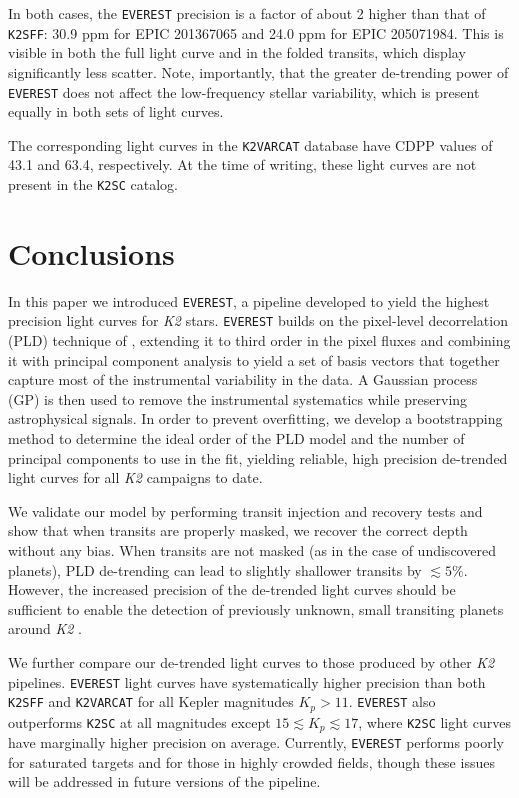 \documentclass[]{emulateapj}
\begin{document}
In both cases, the \texttt{EVEREST} precision is a factor of about 2 higher than that of
\texttt{K2SFF}: 30.9 ppm for EPIC 201367065 and 24.0 ppm for EPIC 205071984. This is visible 
in both the full light curve and in the folded transits,
which display significantly less scatter. Note, importantly, that the greater de-trending
power of \texttt{EVEREST} does not affect the low-frequency stellar variability, which is 
present equally in both sets of light curves.

The corresponding light curves in the \texttt{K2VARCAT} database have CDPP values of 43.1
and 63.4, respectively. At the time of writing, these light curves are not present in the
\texttt{K2SC} catalog.

\section{Conclusions}
\label{sec:conclusions}
In this paper we introduced \texttt{EVEREST}, a pipeline developed to yield the highest
precision light curves for \emph{K2} stars. \texttt{EVEREST} builds on the pixel-level
decorrelation (PLD) technique of \cite{DEM15}, extending it to third order in the pixel
fluxes and combining it with principal component analysis to yield a set of basis
vectors that together capture most of the instrumental variability in the data. A Gaussian
process (GP) is then used to remove the instrumental
systematics while preserving astrophysical signals. In order to prevent overfitting, we
develop a bootstrapping method to determine the ideal order of the PLD
model and the number of principal components to use in the fit, yielding reliable,
high precision de-trended light curves for all \emph{K2} campaigns to date.

We validate our model by performing transit injection and recovery tests and show that
when transits are properly masked, we recover the correct depth without any bias.
When transits are not masked (as in the case of undiscovered planets), PLD de-trending
can lead to slightly shallower transits by $\lesssim 5\%$. However, the increased
precision of the de-trended light curves should be sufficient to enable the
detection of previously unknown, small transiting planets around \emph{K2} \citep{KRU16}.

We further compare our de-trended light curves to those produced by other \emph{K2} pipelines.
\texttt{EVEREST} light curves have systematically higher precision than both \texttt{K2SFF}
and \texttt{K2VARCAT} for all Kepler magnitudes $K_p > 11$. \texttt{EVEREST} also outperforms
\texttt{K2SC} at all magnitudes except $15 \lesssim K_p \lesssim 17$, where \texttt{K2SC}
light curves have marginally higher precision on average. Currently, \texttt{EVEREST}
performs poorly for saturated targets and for those in highly crowded fields, though
these issues will be addressed in future versions of the pipeline.
\end{document}
